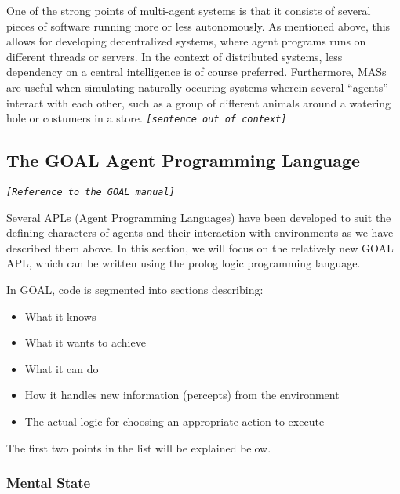 One of the strong points of multi-agent systems is that it consists
of several pieces of software running more or less autonomously. As
mentioned above, this allows for developing decentralized systems,
where agent programs runs on different threads or servers. In the
context of distributed systems, less dependency on a central intelligence
is of course preferred. Furthermore, MASs are useful when simulating
naturally occuring systems wherein several ``agents'' interact with
each other, such as a group of different animals around a watering
hole or costumers in a store. \texttt{\emph{{[}sentence out of context{]}}}


\subsection{The GOAL Agent Programming Language}

\texttt{\emph{{[}Reference to the GOAL manual{]}}}

Several APLs (Agent Programming Languages) have been developed to
suit the defining characters of agents and their interaction with
environments as we have described them above. In this section, we
will focus on the relatively new GOAL APL, which can be written using
the prolog logic programming language.

In GOAL, code is segmented into sections describing:
\begin{itemize}
\item What it knows
\item What it wants to achieve
\item What it can do
\item How it handles new information (percepts) from the environment
\item The actual logic for choosing an appropriate action to execute
\end{itemize}
The first two points in the list will be explained below. 


\subsubsection*{Mental State}

